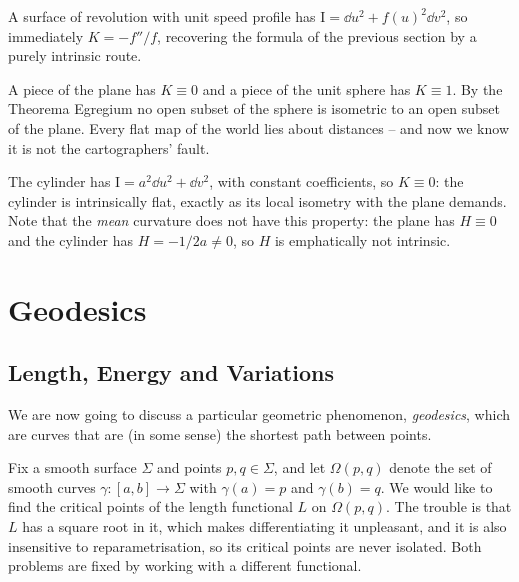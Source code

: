 \documentclass[a4paper]{scrartcl}
\begin{document}
\begin{example}
    A surface of revolution with unit speed profile has $\mathrm{I} = \dd u^2 + f(u)^2\dd v^2$, so immediately $K = -f''/f$, recovering the formula of the previous section by a purely intrinsic route.
\end{example}

\begin{example}
    A piece of the plane has $K \equiv 0$ and a piece of the unit sphere has $K \equiv 1$. By the Theorema Egregium no open subset of the sphere is isometric to an open subset of the plane. Every flat map of the world lies about distances -- and now we know it is not the cartographers' fault.
\end{example}

\begin{example}
    The cylinder has $\mathrm{I} = a^2 \dd u^2 + \dd v^2$, with constant coefficients, so $K \equiv 0$: the cylinder is intrinsically flat, exactly as its local isometry with the plane demands. Note that the \emph{mean} curvature does not have this property: the plane has $H \equiv 0$ and the cylinder has $H = -1/2a \neq 0$, so $H$ is emphatically not intrinsic.
\end{example}

\section{Geodesics}

\subsection{Length, Energy and Variations}

We are now going to discuss a particular geometric phenomenon, \emph{geodesics}, which are curves that are (in some sense) the shortest path between points.

Fix a smooth surface $\Sigma$ and points $p, q \in \Sigma$, and let $\Omega(p,q)$ denote the set of smooth curves $\gamma: [a,b] \rightarrow \Sigma$ with $\gamma(a) = p$ and $\gamma(b) = q$. We would like to find the critical points of the length functional $L$ on $\Omega(p,q)$. The trouble is that $L$ has a square root in it, which makes differentiating it unpleasant, and it is also insensitive to reparametrisation, so its critical points are never isolated. Both problems are fixed by working with a different functional.
\end{document}
